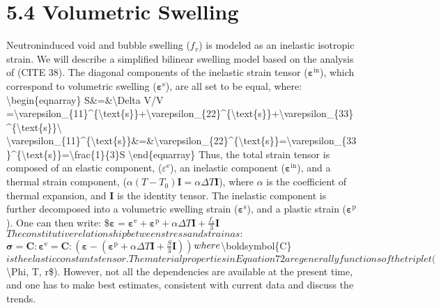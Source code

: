 \documentclass[letterpaper,10pt,english]{jupyterBook}
\begin{document}
	\section{5.4 Volumetric Swelling}
	\label{\detokenize{5 Radiation Effects on Mechanical Properties:volumetric-swelling}}
	\sphinxAtStartPar
	Neutron\sphinxhyphen{}induced void and bubble swelling (\(f_v\)) is modeled as an inelastic isotropic strain.  We will describe a simplified bi\sphinxhyphen{}linear swelling model based on the analysis of (CITE 38). The diagonal components of the inelastic strain tensor (\(\boldsymbol{\varepsilon}^{\text{in}}\)), which correspond to volumetric swelling (\(\boldsymbol{\varepsilon}^{\text{s}}\)), are all set to be equal, where:
	\textbackslash{}begin\{eqnarray\}
	S\&=\&\textbackslash{}Delta V/V =\textbackslash{}varepsilon\_\{11\}\textasciicircum{}\{\textbackslash{}text\{s\}\}+\textbackslash{}varepsilon\_\{22\}\textasciicircum{}\{\textbackslash{}text\{s\}\}+\textbackslash{}varepsilon\_\{33\}\textasciicircum{}\{\textbackslash{}text\{s\}\}\textbackslash{}
	\textbackslash{}varepsilon\_\{11\}\textasciicircum{}\{\textbackslash{}text\{s\}\}\&=\&\textbackslash{}varepsilon\_\{22\}\textasciicircum{}\{\textbackslash{}text\{s\}\}=\textbackslash{}varepsilon\_\{33\}\textasciicircum{}\{\textbackslash{}text\{s\}\}=\textbackslash{}frac\{1\}\{3\}S
	\textbackslash{}end\{eqnarray\}
	Thus, the total strain tensor is composed of an elastic component, (\({\varepsilon}^{\text{e}}\)), an inelastic component (\(\boldsymbol{\varepsilon}^{\text{in}}\)), and a thermal strain component, (\(\alpha (T-T_0)\boldsymbol{I}=\alpha\Delta T \boldsymbol{I}\)), where \(\alpha\) is the coefficient of thermal expansion, and \(\boldsymbol{I}\) is the identity tensor.  The inelastic component is further decomposed into a volumetric swelling strain (\(\boldsymbol{\varepsilon}^{\text{s}}\)), and a plastic strain (\(\boldsymbol{\varepsilon}^{\text{p}}\)). One can then write:
	\$\( \boldsymbol{\varepsilon}=\boldsymbol{\varepsilon}^{\text{e}}+\boldsymbol{\varepsilon}^{\text{p}}+\alpha\Delta T \boldsymbol{I}+\frac{f_v}{3} \boldsymbol{I} \)\(
	The constitutive relationship between stress and strain as:
	\)\(\boldsymbol{\sigma}=\boldsymbol{C}:\boldsymbol{\varepsilon}^{\text{e}} = \boldsymbol{C}:\left( \boldsymbol{\varepsilon}-(\boldsymbol{\varepsilon}^{\text{p}}+\alpha\Delta T \boldsymbol{I}+\frac{S}{3} \boldsymbol{I})\right) \)\(
	\noindent where \)\textbackslash{}boldsymbol\{C\}\( is the elastic constants tensor. The material properties in Equation 72 are generally functions of the triplet (\)\textbackslash{}Phi, T, r\$). However, not all the dependencies are available at the present time, and one has to make best estimates, consistent with current data and discuss the trends.
	
\end{document}
